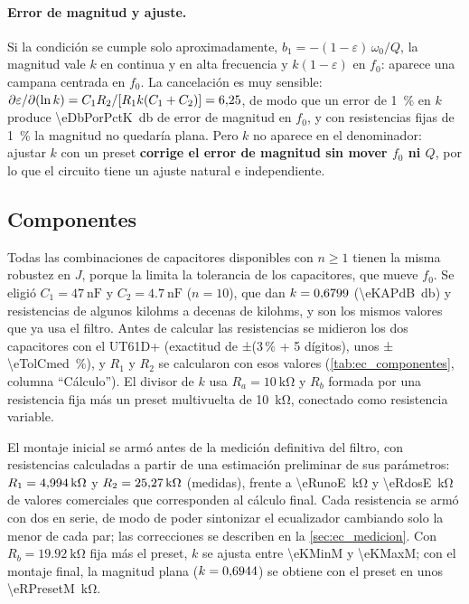 \paragraph{Error de magnitud y ajuste.} Si la condición se cumple solo aproximadamente, $b_1 = -(1-\varepsilon)\,\omega_0/Q$, la magnitud vale $k$ en
continua y en alta frecuencia y $k(1-\varepsilon)$ en $f_0$: aparece una campana centrada en $f_0$. La cancelación es muy sensible:
$\partial\varepsilon/\partial(\ln k) = C_1R_2/[R_1k(C_1+C_2)] = \num{6.25}$, de modo que un error de \qty{1}{\percent} en $k$ produce
\qty{\eDbPorPctK}{\decibel} de error de magnitud en $f_0$, y con resistencias fijas de \qty{1}{\percent} la magnitud no quedaría plana. Pero $k$ no
aparece en el denominador: ajustar $k$ con un preset \textbf{corrige el error de magnitud sin mover $f_0$ ni $Q$}, por lo que el circuito tiene un
ajuste natural e independiente.

\subsection{Componentes}
Todas las combinaciones de capacitores disponibles con $n \ge 1$ tienen la misma robustez en $J$, porque la limita la tolerancia de los
capacitores, que mueve $f_0$. Se eligió $C_1 = \qty{47}{\nano\farad}$ y $C_2 = \qty{4.7}{\nano\farad}$ ($n = 10$), que dan $k = \num{0.6799}$
(\qty{\eKAPdB}{\decibel}) y resistencias de algunos kilohms a decenas de kilohms, y son los mismos valores que ya usa el filtro. Antes de calcular
las resistencias se midieron los dos capacitores con el UT61D+ (exactitud de ±(3\,\% + 5 dígitos), unos ±\qty{\eTolCmed}{\percent}), y $R_1$ y $R_2$
se calcularon con esos valores (\cref{tab:ec_componentes}, columna ``Cálculo''). El divisor de $k$ usa $R_a = \qty{10}{\kilo\ohm}$ y $R_b$
formada por una resistencia fija más un preset multivuelta de \qty{10}{\kilo\ohm}, conectado como resistencia variable.

El montaje inicial se armó antes de la medición definitiva del filtro, con resistencias calculadas a partir de una estimación preliminar de sus
parámetros: $R_1 = \qty{4.994}{\kilo\ohm}$ y $R_2 = \qty{25.27}{\kilo\ohm}$ (medidas), frente a \qty{\eRunoE}{\kilo\ohm} y \qty{\eRdosE}{\kilo\ohm}
de valores comerciales que corresponden al cálculo final. Cada resistencia se armó con dos en serie, de modo de poder sintonizar el ecualizador
cambiando solo la menor de cada par; las correcciones se describen en la \cref{sec:ec_medicion}. Con $R_b = \qty{19.92}{\kilo\ohm}$ fija más el preset,
$k$ se ajusta entre \num{\eKMinM} y \num{\eKMaxM}; con el montaje final, la magnitud plana ($k = \num{0.6944}$) se obtiene con el preset en unos
\qty{\eRPresetM}{\kilo\ohm}.

